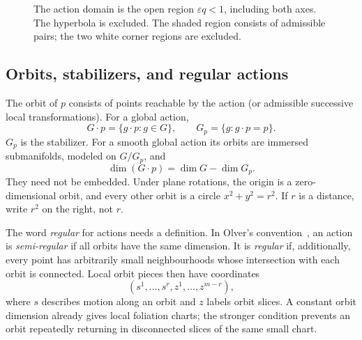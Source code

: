 \documentclass[11pt,a4paper]{article}
\numberwithin{equation}{section}
\theoremstyle{definition}
\theoremstyle{plain}
\theoremstyle{remark}
\begin{document}
\begin{figure}[htbp]\centering
{}
\caption{The action domain is the open region $\varepsilon q<1$, including both axes. The hyperbola is excluded. The shaded region consists of admissible pairs; the two white corner regions are excluded.}
\end{figure}

\subsection{Orbits, stabilizers, and regular actions}\label{sec:regular-actions}
The orbit of $p$ consists of points reachable by the action (or admissible successive local transformations). For a global action,
\[
G\cdot p=\{g\cdot p:g\in G\},\qquad G_p=\{g:g\cdot p=p\}.
\]
$G_p$ is the stabilizer. For a smooth global action its orbits are immersed submanifolds, modeled on $G/G_p$, and
\[
\dim(G\cdot p)=\dim G-\dim G_p.
\]
They need not be embedded. Under plane rotations, the origin is a zero-dimensional orbit, and every other orbit is a circle $x^2+y^2=r^2$. If $r$ is a distance, write $r^2$ on the right, not $r$.

The word \emph{regular} for actions needs a definition. In Olver's convention~\cite{olvernotes}, an action is \emph{semi-regular} if all orbits have the same dimension. It is \emph{regular} if, additionally, every point has arbitrarily small neighbourhoods whose intersection with each orbit is connected. Local orbit pieces then have coordinates
\[
(s^1,\ldots,s^r,z^1,\ldots,z^{m-r}),
\]
where $s$ describes motion along an orbit and $z$ labels orbit slices. A constant orbit dimension already gives local foliation charts; the stronger condition prevents an orbit repeatedly returning in disconnected slices of the same small chart.
\end{document}
